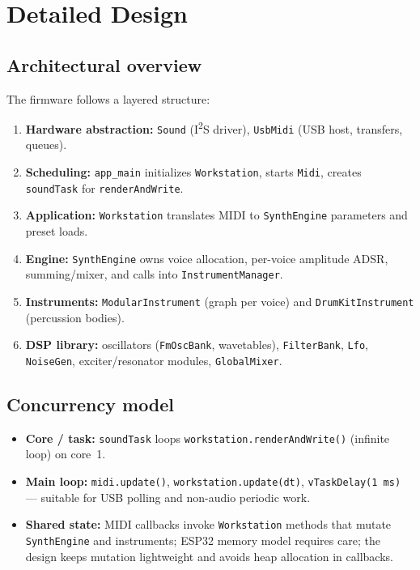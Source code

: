 \documentclass[11pt,a4paper]{article}
\begin{document}
\section{Detailed Design}

\subsection{Architectural overview}
The firmware follows a layered structure:
\begin{enumerate}[noitemsep]
  \item \textbf{Hardware abstraction:} \texttt{Sound} (I\textsuperscript{2}S driver), \texttt{UsbMidi} (USB host, transfers, queues).
  \item \textbf{Scheduling:} \texttt{app\_main} initializes \texttt{Workstation}, starts \texttt{Midi}, creates \texttt{soundTask} for \texttt{renderAndWrite}.
  \item \textbf{Application:} \texttt{Workstation} translates MIDI to \texttt{SynthEngine} parameters and preset loads.
  \item \textbf{Engine:} \texttt{SynthEngine} owns voice allocation, per-voice amplitude ADSR, summing/mixer, and calls into \texttt{InstrumentManager}.
  \item \textbf{Instruments:} \texttt{ModularInstrument} (graph per voice) and \texttt{DrumKitInstrument} (percussion bodies).
  \item \textbf{DSP library:} oscillators (\texttt{FmOscBank}, wavetables), \texttt{FilterBank}, \texttt{Lfo}, \texttt{NoiseGen}, exciter/resonator modules, \texttt{GlobalMixer}.
\end{enumerate}

\subsection{Concurrency model}
\begin{itemize}[noitemsep]
  \item \textbf{Core / task:} \texttt{soundTask} loops \texttt{workstation.renderAndWrite()} (infinite loop) on core~1.
  \item \textbf{Main loop:} \texttt{midi.update()}, \texttt{workstation.update(dt)}, \texttt{vTaskDelay(1\,ms)} --- suitable for USB polling and non-audio periodic work.
  \item \textbf{Shared state:} MIDI callbacks invoke \texttt{Workstation} methods that mutate \texttt{SynthEngine} and instruments; ESP32 memory model requires care; the design keeps mutation lightweight and avoids heap allocation in callbacks.
\end{itemize}
\end{document}
